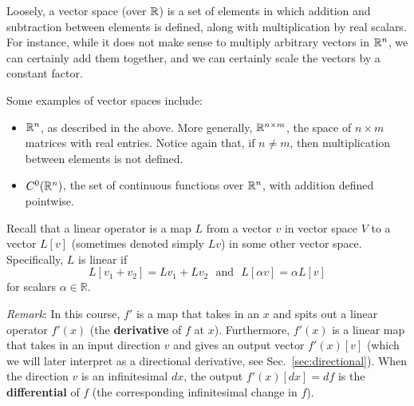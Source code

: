 \begin{recall}
    Loosely, a vector space (over $\mathbb R$) is a set of elements in which addition and subtraction between elements is defined, along with multiplication by real scalars. For instance, while it does not make sense to multiply arbitrary vectors in $\mathbb R^n$, we can certainly add them together, and we can certainly scale the vectors by a constant factor.
\end{recall}

Some examples of vector spaces include:
\begin{itemize}
    \item $\mathbb R^n$, as described in the above. More generally, $\mathbb R^{n\times m}$, the space of $n\times m$ matrices with real entries. Notice again that, if $n\neq m$, then multiplication between elements is not defined.
    \item $C^0(\mathbb R^n)$, the set of continuous functions over $\mathbb R^n$, with addition defined pointwise.
\end{itemize}

\begin{recall}
Recall that a linear operator is a map $L$ from a vector $v$ in vector space $V$ to a vector $L[v]$ (sometimes denoted simply $Lv$) in some other vector space. Specifically, $L$ is linear if
\[
L[v_1+v_2] = Lv_1 + Lv_2 \text{~~and~~} L[\alpha v] = \alpha L[v]
\]
for scalars $\alpha \in \mathbb{R}$.

\textit{Remark}: In this course, $f'$ is a map that takes in an $x$ and spits out a linear operator $f'(x)$ (the \textbf{derivative} of $f$ at $x$). Furthermore, $f'(x)$ is a linear map that takes in an input direction $v$ and gives an output vector $f'(x)[v]$ (which we will later interpret as a directional derivative, see Sec.~\ref{sec:directional}). When the direction $v$ is an infinitesimal $d x$, the output $f'(x)[dx] = df$ is the \textbf{differential} of $f$ (the corresponding infinitesimal change in $f$).
\end{recall}


